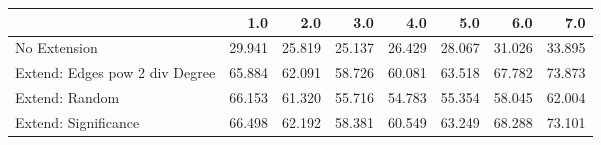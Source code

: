 \begin{tabular}{lrrrrrrr}
\toprule
{} &    1.0 &    2.0 &    3.0 &    4.0 &    5.0 &    6.0 &    7.0 \\
\midrule
No Extension                   & 29.941 & 25.819 & 25.137 & 26.429 & 28.067 & 31.026 & 33.895 \\
Extend: Edges pow 2 div Degree & 65.884 & 62.091 & 58.726 & 60.081 & 63.518 & 67.782 & 73.873 \\
Extend: Random                 & 66.153 & 61.320 & 55.716 & 54.783 & 55.354 & 58.045 & 62.004 \\
Extend: Significance           & 66.498 & 62.192 & 58.381 & 60.549 & 63.249 & 68.288 & 73.101 \\
\bottomrule
\end{tabular}
